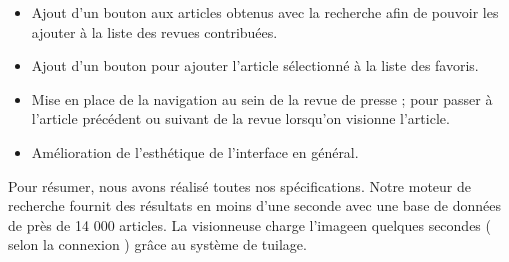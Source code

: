 \begin{itemize}
	\item Ajout d'un bouton aux articles obtenus avec la recherche afin de pouvoir les ajouter à la liste des revues contribuées.

	\item Ajout d'un bouton pour ajouter l'article sélectionné à la liste des favoris. 

	\item Mise en place de la navigation au sein de la revue de presse ; pour passer à l'article précédent ou suivant de la revue lorsqu'on visionne l'article.

	\item Amélioration de l'esthétique de l'interface en général.

\end{itemize}

Pour résumer, nous avons réalisé toutes nos spécifications. Notre moteur de recherche fournit des résultats en moins d'une seconde avec une base de données de près de 14 000 articles. La visionneuse charge l'imageen quelques secondes ( selon la connexion ) grâce au système de tuilage. 